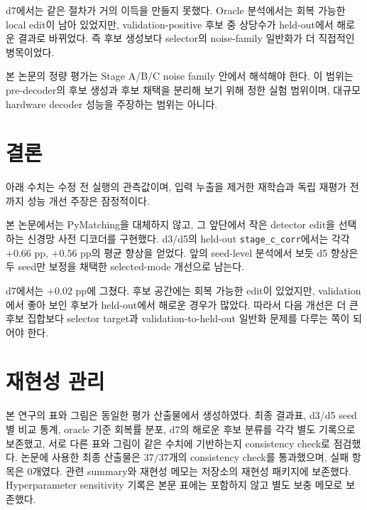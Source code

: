 \documentclass[aps,prd,12pt,twocolumn,superscriptaddress,floatfix,longbibliography]{revtex4-2}
\begin{document}
d7에서는 같은 절차가 거의 이득을 만들지 못했다. Oracle 분석에서는 회복 가능한
local edit이 남아 있었지만, validation-positive 후보 중 상당수가 held-out에서
해로운 결과로 바뀌었다. 즉 후보 생성보다 selector의 noise-family 일반화가 더
직접적인 병목이었다.

본 논문의 정량 평가는 Stage A/B/C noise family 안에서 해석해야 한다. 이 범위는
pre-decoder의 후보 생성과 후보 채택을 분리해 보기 위해 정한 실험 범위이며,
대규모 hardware decoder 성능을 주장하는 범위는 아니다.

\section{결론}

아래 수치는 수정 전 실행의 관측값이며, 입력 누출을 제거한 재학습과 독립
재평가 전까지 성능 개선 주장은 잠정적이다.

본 논문에서는 PyMatching을 대체하지 않고, 그 앞단에서 작은 detector edit을
선택하는 신경망 사전 디코더를 구현했다. d3/d5의 held-out
\texttt{stage\_c\_corr}에서는 각각 \(+0.66\) pp, \(+0.56\) pp의 평균 향상을
얻었다. 앞의 seed-level 분석에서 보듯 d5 향상은 두 seed만 보정을 채택한
selected-mode 개선으로 남는다.

d7에서는 \(+0.02\) pp에 그쳤다. 후보 공간에는 회복 가능한 edit이 있었지만,
validation에서 좋아 보인 후보가 held-out에서 해로운 경우가 많았다. 따라서 다음
개선은 더 큰 후보 집합보다 selector target과 validation-to-held-out 일반화 문제를
다루는 쪽이 되어야 한다.

\section*{재현성 관리}

본 연구의 표와 그림은 동일한 평가 산출물에서 생성하였다. 최종 결과표, d3/d5
seed별 비교 통계, oracle 기준 회복률 분포, d7의 해로운 후보 분류를 각각 별도
기록으로 보존했고, 서로 다른 표와 그림이 같은 수치에 기반하는지 consistency
check로 점검했다. 논문에 사용한 최종 산출물은 \(37/37\)개의 consistency check를
통과했으며, 실패 항목은 \(0\)개였다. 관련 summary와 재현성 메모는 저장소의
재현성 패키지에 보존했다. Hyperparameter sensitivity 기록은 본문 표에는
포함하지 않고 별도 보충 메모로 보존했다.



\end{document}
